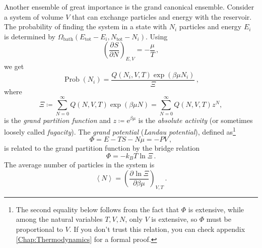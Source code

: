 \documentclass{article}
\theoremstyle{plain}\theoremheaderfont{\normalfont\bfseries}\theorembodyfont{\rmfamily}\theoremseparator{.}\newtheorem*{thm}{Theorem}\newtheorem*{law}{Law}\newtheorem*{pos}{Postulate}
\numberwithin{equation}{section}
\newcommand{\ee}{\mathrm{e}}
\newcommand{\pdv}[3][]{\frac{\partial^{#1} #2}{{\partial #3}^{#1}}}
\newcommand{\eval}[1]{\left\langle #1 \right\rangle}
\newcommand{\bath}{\text{bath}}
\newcommand{\tot}{\text{tot}}
\DeclareMathOperator{\Prob}{Prob}
\begin{document}
    Another ensemble of great importance is the grand canonical ensemble. Consider a system of volume \(V\) that can exchange particles and energy with the reservoir. The probability of finding the system in a state with \(N_i\) particles and energy \(E_i\) is determined by \(\Omega_{\bath}(E_{\tot}-E_i,N_{\tot}-N_i)\). Using
    \begin{equation}
        \left(\pdv{S}{N}\right)_{E,V}=-\frac{\mu}{T}\,,
    \end{equation}
    we get
    \begin{equation}
        \Prob(N_i)=\frac{Q(N_i,V,T)\exp(\beta\mu N_i)}{\Xi}\,,
    \end{equation}
    where
    \begin{equation}
        \Xi\coloneqq\sum_{N=0}^{\infty}Q(N,V,T)\exp(\beta\mu N)=\sum_{N=0}^{\infty}Q(N,V,T)z^N,
    \end{equation}
    is the \textit{grand partition function} and \(z\coloneqq \ee^{\beta\mu}\) is the \textit{absolute activity} (or sometimes loosely called \textit{fugacity}). The \textit{grand potential} (\textit{Landau potential}), defined as\footnote{The second equality below follows from the fact that \(\Phi\) is extensive, while among the natural variables \(T,V,N\), only \(V\) is extensive, so \(\Phi\) must be proportional to \(V\). If you don't trust this relation, you can check appendix \ref{Chap:Thermodynamics} for a formal proof.}
    \begin{equation}
        \Phi=E-TS-N\mu=-PV\,,
    \end{equation}
    is related to the grand partition function by the bridge relation
    \begin{equation}
        \Phi=-k_B T\ln\Xi\,.
    \end{equation}
    The average number of particles in the system is
    \begin{equation}
        \eval{N}=\left(\pdv{\ln\Xi}{\beta\mu}\right)_{V,T}\,.
    \end{equation}
\end{document}
